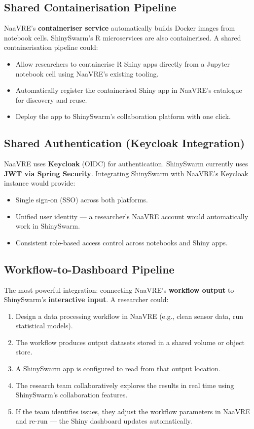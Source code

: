 \documentclass[12pt,a4paper]{article}
\begin{document}
\subsection{Shared Containerisation Pipeline}

NaaVRE's \textbf{containeriser service} automatically builds Docker images from notebook cells. ShinySwarm's R microservices are also containerised. A shared containerisation pipeline could:

\begin{itemize}[nosep]
  \item Allow researchers to containerise R Shiny apps directly from a Jupyter notebook cell using NaaVRE's existing tooling.
  \item Automatically register the containerised Shiny app in NaaVRE's catalogue for discovery and reuse.
  \item Deploy the app to ShinySwarm's collaboration platform with one click.
\end{itemize}

\subsection{Shared Authentication (Keycloak Integration)}

NaaVRE uses \textbf{Keycloak} (OIDC) for authentication. ShinySwarm currently uses \textbf{JWT via Spring Security}. Integrating ShinySwarm with NaaVRE's Keycloak instance would provide:

\begin{itemize}[nosep]
  \item Single sign-on (SSO) across both platforms.
  \item Unified user identity --- a researcher's NaaVRE account would automatically work in ShinySwarm.
  \item Consistent role-based access control across notebooks and Shiny apps.
\end{itemize}

\subsection{Workflow-to-Dashboard Pipeline}

The most powerful integration: connecting NaaVRE's \textbf{workflow output} to ShinySwarm's \textbf{interactive input}. A researcher could:

\begin{enumerate}[nosep]
  \item Design a data processing workflow in NaaVRE (e.g., clean sensor data, run statistical models).
  \item The workflow produces output datasets stored in a shared volume or object store.
  \item A ShinySwarm app is configured to read from that output location.
  \item The research team collaboratively explores the results in real time using ShinySwarm's collaboration features.
  \item If the team identifies issues, they adjust the workflow parameters in NaaVRE and re-run --- the Shiny dashboard updates automatically.
\end{enumerate}
\end{document}
